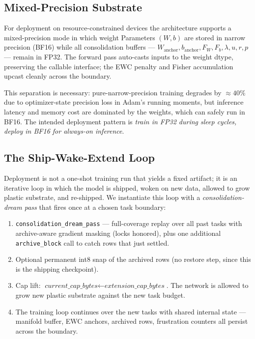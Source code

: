 \documentclass[11pt]{article}
\newcommand{\anchorW}{W_{\text{anchor}}}
\newcommand{\anchorB}{b_{\text{anchor}}}
\begin{document}
\subsection{Mixed-Precision Substrate}
\label{sec:mixed-precision}

For deployment on resource-constrained devices the architecture
supports a mixed-precision mode in which weight Parameters $(W, b)$
are stored in narrow precision (BF16) while all consolidation buffers
--- $\anchorW, \anchorB, F_W, F_b, \lambda, u, r, p$ --- remain in
FP32. The forward pass auto-casts inputs to the weight dtype,
preserving the callable interface; the EWC penalty and Fisher
accumulation upcast cleanly across the boundary.

This separation is necessary: pure-narrow-precision training degrades
by $\approx\!40\%$ due to optimizer-state precision loss in Adam's
running moments, but inference latency and memory cost are dominated
by the weights, which can safely run in BF16. The intended deployment
pattern is \emph{train in FP32 during sleep cycles, deploy in BF16 for
always-on inference}.

\subsection{The Ship-Wake-Extend Loop}
\label{sec:ship-wake-extend}\label{app:ship-wake-extend}

Deployment is not a one-shot training run that yields a fixed
artifact; it is an iterative loop in which the model is shipped, woken
on new data, allowed to grow plastic substrate, and re-shipped. We
instantiate this loop with a \emph{consolidation-dream pass} that
fires once at a chosen task boundary:
\begin{enumerate}[leftmargin=2em]
  \item \texttt{consolidation\_dream\_pass} --- full-coverage replay
        over all past tasks with archive-aware gradient masking (locks
        honored), plus one additional \texttt{archive\_block} call to
        catch rows that just settled.
  \item Optional permanent int8 snap of the archived rows (no restore
        step, since this is the shipping checkpoint).
  \item Cap lift:
        $\textit{current\_cap\_bytes} \leftarrow
         \textit{extension\_cap\_bytes}$.
        The network is allowed to grow new plastic substrate against
        the new task budget.
  \item The training loop continues over the new tasks with shared
        internal state --- manifold buffer, EWC anchors, archived
        rows, frustration counters all persist across the boundary.
\end{enumerate}
\end{document}
